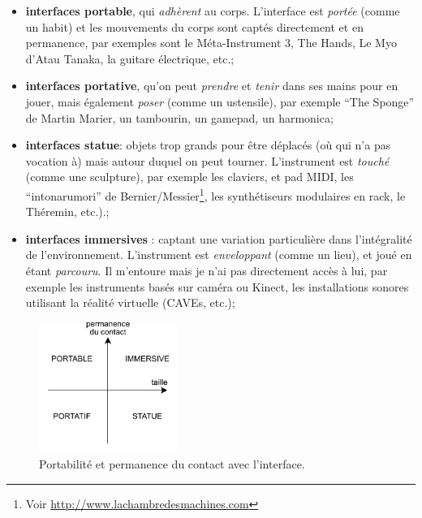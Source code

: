 \begin{itemize}[noitemsep]
	\item \textbf{interfaces portable}, qui \textit{adhèrent} au corps. L'interface est \textit{portée} (comme un habit) et les mouvements du corps sont captés directement et en permanence, par exemples sont le Méta-Instrument 3, The Hands, Le Myo d'Atau Tanaka, la guitare électrique, etc.;
	\item \textbf{interfaces portative}, qu'on peut \textit{prendre} et \textit{tenir} dans ses mains pour en jouer, mais également \textit{poser} (comme un ustensile), par exemple ``The Sponge'' de Martin Marier, un tambourin, un gamepad, un harmonica;
	\item \textbf{interfaces statue}: objets trop grands pour être déplacés (où qui n'a pas vocation à) mais autour duquel on peut tourner. L'instrument est \textit{touché} (comme une sculpture), par exemple les claviers, et pad \gls{MIDI}, les ``intonarumori'' de Bernier/Messier\footnote{Voir \url{http://www.lachambredesmachines.com}}, les synthétiseurs modulaires en rack, le Théremin, etc.).;
	\item \textbf{interfaces immersives} : captant une variation particulière dans l'intégralité de l'environnement. L'instrument est \textit{enveloppant} (comme un lieu), et joué en étant \textit{parcouru}. Il m'entoure mais je n'ai pas directement accès à lui, par exemple les instruments basés sur caméra ou Kinect, les installations sonores utilisant la réalité virtuelle (CAVEs, etc.);
\end{itemize}
\begin{figure}
	\vspace{-1em}
	\captionsetup{format=plain}
	\centering
 	\includegraphics[width=0.4\textwidth]{gfx/05_interfaces/interface-portabilite.pdf}
	\caption[Portabilité et permanence du contact avec l'interface.]{Portabilité et permanence du contact avec l'interface.}
 	\label{fig:interfaces:portabilite}
\end{figure}
